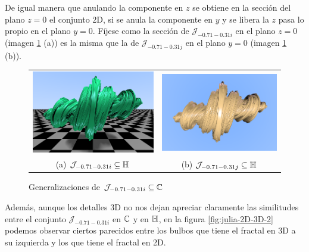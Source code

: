 De igual manera que anulando la componente en $z$ se obtiene en la sección del plano $z=0$ el conjunto 2D, si se anula la componente en $y$ y se libera la $z$ pasa lo propio en el plano $y=0$. Fíjese como la sección de $\mathcal{J}_{-0.71-0.31i}$ en el plano $z=0$ (imagen \ref{fig:julia-3D-varias} (a)) es la misma que la de $\mathcal{J}_{-0.71-0.31j}$ en el plano $y=0$ (imagen \ref{fig:julia-3D-varias} (b)).

\begin{figure}[ht]
    \centering
    \begin{tabular}{cc}
        \includegraphics[scale=0.4]{img/C9/julia-3D-frontal-2.png} &
      \includegraphics[scale=0.44]{img/C9/julia-3D-abajo-2.png} \\    
    (a) $\mathcal{J}_{-0.71-0.31i}\subseteq\mathbb{H}$ & (b) $\mathcal{J}_{-0.71-0.31j}\subseteq\mathbb{H}$  \\
    \end{tabular}
    \caption{Generalizaciones de $\mathcal{J}_{-0.71-0.31i}\subseteq\mathbb{C}$}
    \label{fig:julia-3D-varias}
\end{figure}

Además, aunque los detalles 3D no nos dejan apreciar claramente las similitudes entre el conjunto $\mathcal{J}_{-0.71-0.31i}$ en $\mathbb{C}$ y en $\mathbb{H}$, en la figura \ref{fig:julia-2D-3D-2} podemos observar ciertos parecidos entre los bulbos que tiene el fractal en 3D a su izquierda y los que tiene el fractal en 2D.


